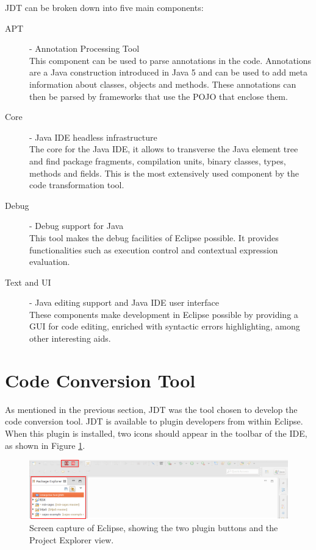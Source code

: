 	JDT can be broken down into five main components: 

	\begin{description}
		\item[APT] - Annotation Processing Tool\hfill \\
  			This component can be used to parse annotations in the code. Annotations are a Java construction introduced in Java 5 and can be used to add meta information about classes, objects and methods. These annotations can then be parsed by frameworks that use the POJO that enclose them.
		\item[Core] - Java IDE headless infrastructure \hfill \\
  			The core for the Java IDE, it allows to transverse the Java element tree and find package fragments, compilation units, binary classes, types, methods and fields. This is the most extensively used component by the code transformation tool.
		\item[Debug] - Debug support for Java\hfill \\
  			This tool makes the debug facilities of Eclipse possible. It provides functionalities such as execution control and contextual expression evaluation.
		\item[Text and UI] - Java editing support and Java IDE user interface \hfill \\
  			These components make development in Eclipse possible by providing a GUI for code editing, enriched with syntactic errors highlighting, among other interesting aids.
	\end{description}

\section{Code Conversion Tool}
\label{sec:codeConvertionTool}

As mentioned in the previous section, JDT was the tool chosen to develop the code conversion tool. JDT is available to plugin developers from within Eclipse. When this plugin is installed, two icons should appear in the toolbar of the IDE, as shown in Figure \ref{fig:cct_screenshot}.

\begin{figure}[h]
	\centering
	\includegraphics[width=\linewidth]{figures/cct_screenshot.png}
	\caption{Screen capture of Eclipse, showing the two plugin buttons and the Project Explorer view.}
	\label{fig:cct_screenshot}
\end{figure}

